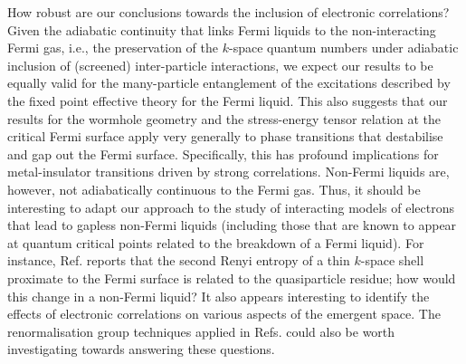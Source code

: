 How robust are our conclusions towards the inclusion of electronic correlations? Given the adiabatic continuity that links Fermi liquids to the non-interacting Fermi gas, i.e., the preservation of the $k$-space quantum numbers under adiabatic inclusion of (screened) inter-particle interactions, we expect our results to be equally valid for the many-particle entanglement of the excitations described by the fixed point effective theory for the Fermi liquid. This also suggests that our results for the wormhole geometry and the stress-energy tensor relation at the critical Fermi surface apply very generally to phase transitions that destabilise and gap out the Fermi surface. Specifically, this has profound implications for metal-insulator transitions driven by strong correlations.
Non-Fermi liquids are, however, not adiabatically continuous to the Fermi gas. Thus, it should be interesting to adapt our approach to the study of interacting models of electrons that lead to gapless non-Fermi liquids (including those that are known to appear at quantum critical points related to the breakdown of a Fermi liquid). For instance, Ref.\cite{flynn2022} reports that the second Renyi entropy of a thin $k$-space shell proximate to the Fermi surface is related to the quasiparticle residue; how would this change in a non-Fermi liquid?  It also appears interesting to identify the effects of electronic correlations on various aspects of the emergent space.
The renormalisation group techniques applied in Refs.\cite{balasubramanian2012momentum,mcdermott2013,costa2022,flynn2022,PatraEntanglement2023} could also be worth investigating towards answering these questions. 

